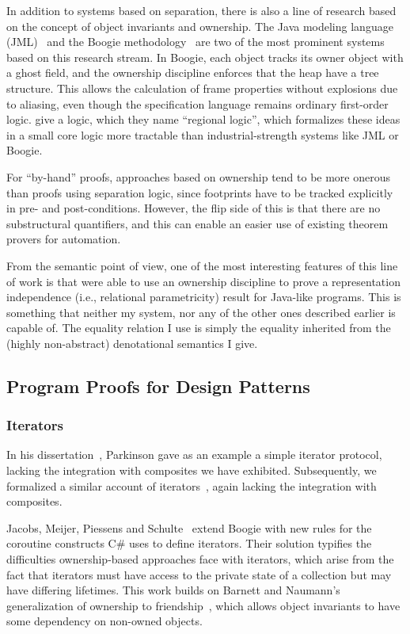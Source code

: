 In addition to systems based on separation, there is also a line of
research based on the concept of object invariants and ownership.  The
Java modeling language (JML)~\cite{jml} and the Boogie
methodology~\cite{boogie} are two of the most prominent systems based
on this research stream. In Boogie, each object tracks its owner
object with a ghost field, and the ownership discipline enforces that
the heap have a tree structure. This allows the calculation of frame
properties without explosions due to aliasing, even though the
specification language remains ordinary first-order
logic. \citet{banerjee-naumann-regions} give a logic, which they name
``regional logic'', which formalizes these ideas in a small core logic
more tractable than industrial-strength systems like JML or Boogie.

For ``by-hand'' proofs, approaches based on ownership tend to be more
onerous than proofs using separation logic, since footprints have to
be tracked explicitly in pre- and post-conditions. However, the flip
side of this is that there are no substructural quantifiers, and this
can enable an easier use of existing theorem provers for automation. 

From the semantic point of view, one of the most interesting features
of this line of work is that \citet{banerjee-naumann-rep} were able to
use an ownership discipline to prove a representation independence
(i.e., relational parametricity) result for Java-like programs.  This
is something that neither my system, nor any of the other ones
described earlier is capable of.  The equality relation I use is
simply the equality inherited from the (highly non-abstract)
denotational semantics I give.

\subsection{Program Proofs for Design Patterns}

\subsubsection{Iterators}

In his dissertation~\cite{parkinson-thesis}, Parkinson gave as an
example a simple iterator protocol, lacking the integration with
composites we have exhibited.  Subsequently, we formalized a similar
account of iterators~\cite{iterator}, again lacking the integration
with composites. 

Jacobs, Meijer, Piessens and Schulte~\cite{iterators-revisited} extend
Boogie with new rules for the coroutine constructs C\# uses to define
iterators. Their solution typifies the difficulties ownership-based
approaches face with iterators, which arise from the fact that
iterators must have access to the private state of a collection but
may have differing lifetimes. This work builds on Barnett and
Naumann's generalization of ownership to friendship~\cite{friends},
which allows object invariants to have some dependency on non-owned
objects. 

